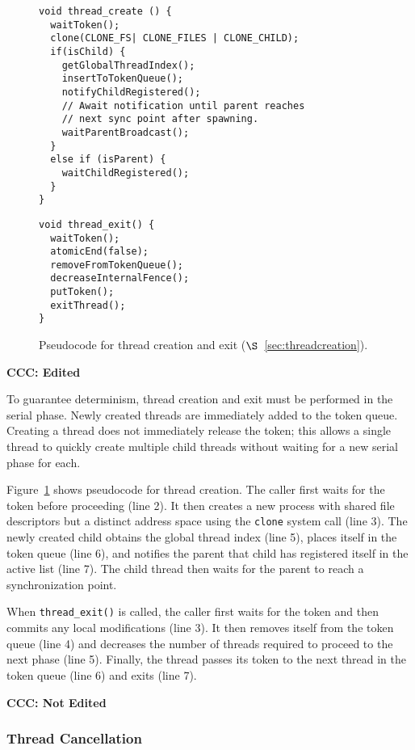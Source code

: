 \label{sec:threadcreation}

\begin{figure}
\begin{lstlisting}
void thread_create () {
  waitToken();
  clone(CLONE_FS| CLONE_FILES | CLONE_CHILD);
  if(isChild) {
    getGlobalThreadIndex();
	insertToTokenQueue();
	notifyChildRegistered();
	// Await notification until parent reaches 
    // next sync point after spawning.
	waitParentBroadcast();	
  }
  else if (isParent) {
	waitChildRegistered();
  }
}
\end{lstlisting}
\begin{lstlisting}
void thread_exit() {
  waitToken();
  atomicEnd(false);
  removeFromTokenQueue();
  decreaseInternalFence();
  putToken();
  exitThread(); 
}
\end{lstlisting}
\caption{Pseudocode for thread creation and exit ($\S$~\ref{sec:threadcreation}).
\label{fig:threadcreation}
}
\end{figure}

\textbf{CCC: Edited}

To guarantee determinism, thread creation and exit must be performed in the serial phase.  Newly created threads are immediately added to the token queue.  Creating a thread does not immediately release the token; this allows a single thread to quickly create multiple child threads without waiting for a new serial phase for each.

Figure~\ref{fig:threadcreation} shows pseudocode for thread creation. The caller first waits for the token before proceeding (line 2).  It then creates a new process with shared file descriptors but a distinct address space using the \texttt{clone} system call (line 3).  The newly created child obtains the global thread index (line 5), places itself in the token queue (line 6), and notifies the parent that child has registered itself in the active list (line 7). The child thread then waits for the parent to reach a synchronization point.

When \texttt{thread\_exit()} is called, the caller first waits for the token and then commits any local modifications (line 3). It then removes itself from the token queue (line 4) and decreases the number of threads required to proceed to the next phase (line 5). Finally, the thread passes its token to the next thread in the token queue (line 6) and exits (line 7).

\textbf{CCC: Not Edited}

\subsubsection{Thread Cancellation}

